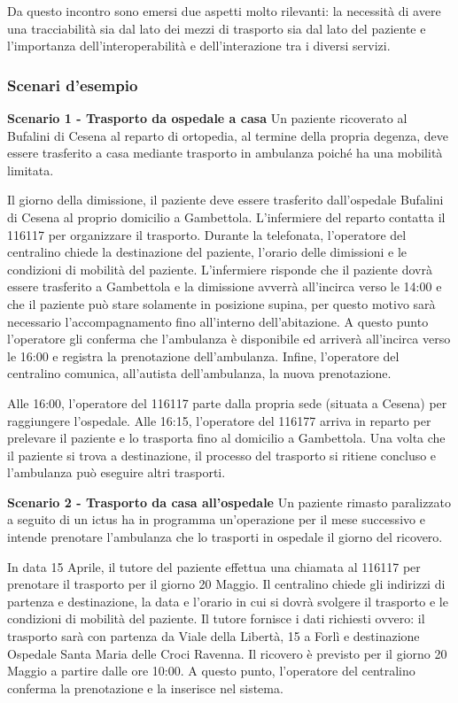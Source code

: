 \documentclass[12pt]{article}
\begin{document}
Da questo incontro sono emersi due aspetti molto rilevanti: la necessità di avere una tracciabilità sia dal lato dei mezzi di trasporto sia dal lato del paziente e l'importanza dell'interoperabilità e dell'interazione tra i diversi servizi.

\subsubsection{Scenari d'esempio}


\textbf{Scenario 1 - Trasporto da ospedale a casa}
Un paziente ricoverato al Bufalini di Cesena al reparto di ortopedia, al termine della propria degenza, deve essere trasferito a casa mediante trasporto in ambulanza poiché ha una mobilità limitata.

Il giorno della dimissione, il paziente deve essere trasferito dall'ospedale Bufalini di Cesena al proprio domicilio a Gambettola. L'infermiere del reparto contatta il 116117 per organizzare il trasporto.
Durante la telefonata, l'operatore del centralino chiede la destinazione del paziente, l'orario delle dimissioni e le condizioni di mobilità del paziente.
L'infermiere risponde che il paziente dovrà essere trasferito a Gambettola e la dimissione avverrà all'incirca verso le 14:00 e che il paziente può stare solamente in posizione supina, per questo motivo sarà necessario l'accompagnamento fino all'interno dell'abitazione. 
A questo punto l'operatore gli conferma che l'ambulanza è disponibile ed arriverà all'incirca verso le 16:00 e registra la prenotazione dell'ambulanza.
Infine, l'operatore del centralino comunica, all'autista dell'ambulanza, la nuova prenotazione.

Alle 16:00, l'operatore del 116117 parte dalla propria sede (situata a Cesena) per raggiungere l'ospedale.
Alle 16:15, l'operatore del 116177 arriva in reparto per prelevare il paziente e lo trasporta fino al domicilio a Gambettola.
Una volta che il paziente si trova a destinazione, il processo del trasporto si ritiene concluso e l'ambulanza può eseguire altri trasporti.

\hfill \break
\textbf{Scenario 2 - Trasporto da casa all'ospedale}
Un paziente rimasto paralizzato a seguito di un ictus ha in programma un'operazione per il mese successivo e intende prenotare l'ambulanza che lo trasporti in ospedale il giorno del ricovero.

In data 15 Aprile, il tutore del paziente effettua una chiamata al 116117 per prenotare il trasporto per il giorno 20 Maggio. Il centralino chiede gli indirizzi di partenza e destinazione, la data e l'orario in cui si dovrà svolgere il trasporto e le condizioni di mobilità del paziente. 
Il tutore fornisce i dati richiesti ovvero: il trasporto sarà con partenza da Viale della Libertà, 15 a Forlì e destinazione Ospedale Santa Maria delle Croci Ravenna. Il ricovero è previsto per il giorno 20 Maggio a partire dalle ore 10:00.
A questo punto, l'operatore del centralino conferma la prenotazione e la inserisce nel sistema.
\end{document}
